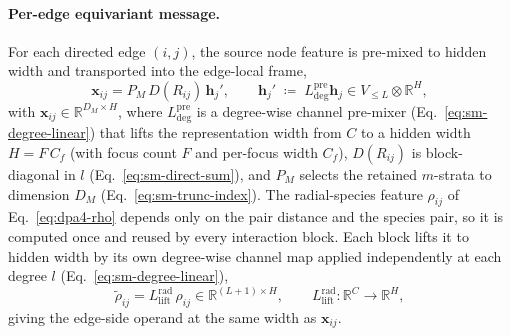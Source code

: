 \paragraph{Per-edge equivariant message.}
For each directed edge $(i,j)$, the source node feature is pre-mixed to hidden
width and transported into the edge-local frame,
\begin{equation}
    \mathbf{x}_{ij}=P_M\,D(R_{ij})\,\mathbf{h}_j',
    \qquad
    \mathbf{h}_j'\;\coloneqq\;L^{\mathrm{pre}}_{\mathrm{deg}}\mathbf{h}_j
    \in V_{\le L}\otimes\mathbb{R}^{H},
    \label{eq:dpa4-local-projection}
\end{equation}
with $\mathbf{x}_{ij}\in\mathbb{R}^{D_M\times H}$, where
$L^{\mathrm{pre}}_{\mathrm{deg}}$ is a degree-wise channel pre-mixer
(Eq.~\eqref{eq:sm-degree-linear}) that lifts the representation width from
$C$ to a hidden width $H=F\,C_f$ (with focus count $F$ and per-focus width
$C_f$), $D(R_{ij})$ is block-diagonal in $l$ (Eq.~\eqref{eq:sm-direct-sum}), and
$P_M$ selects the retained $m$-strata to dimension $D_M$
(Eq.~\eqref{eq:sm-trunc-index}).
The radial-species feature $\rho_{ij}$ of Eq.~\eqref{eq:dpa4-rho} depends only on the pair distance and the species pair, so it is computed once and reused by every interaction block.
Each block lifts it to hidden width by its own degree-wise channel map applied independently at each degree $l$ (Eq.~\eqref{eq:sm-degree-linear}),
\begin{equation}
    \widetilde{\rho}_{ij} = L^{\mathrm{rad}}_{\mathrm{lift}}\,\rho_{ij}
    \in\mathbb{R}^{(L+1)\times H},
    \qquad
    L^{\mathrm{rad}}_{\mathrm{lift}}:\mathbb{R}^{C}\to\mathbb{R}^{H},
    \label{eq:dpa4-rho-lift}
\end{equation}
giving the edge-side operand at the same width as $\mathbf{x}_{ij}$.

